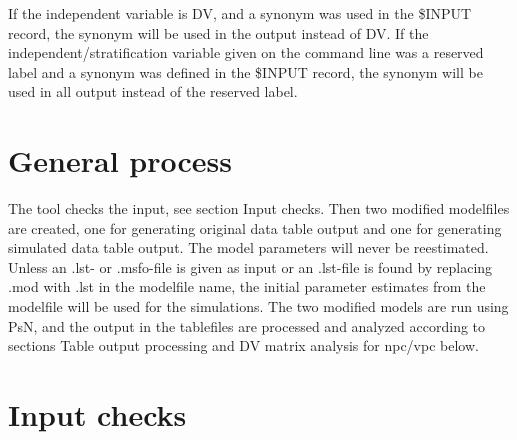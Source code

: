 If the independent variable is DV, and a synonym was used in the \$INPUT record, the synonym will be used in the output instead of DV.  If  the independent/stratification variable given on the command line was a reserved label and a synonym was defined in the \$INPUT record, the synonym will be used in all output instead of the reserved label.

\section{General process}
The tool checks the input, see section Input checks. Then two modified modelfiles are created, one for generating original data table output and one for generating simulated data table output. The model parameters will never be reestimated. Unless an .lst- or .msfo-file is given as input or an .lst-file is found by replacing .mod with .lst in the modelfile name, the initial parameter estimates from the modelfile will be used for the simulations. The two modified models are run using PsN, and the output in the tablefiles are processed and analyzed according to sections Table output processing and DV matrix analysis for npc/vpc below. 

\section{Input checks}

